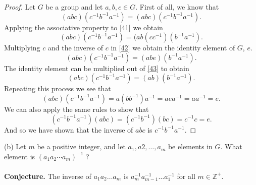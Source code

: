 \documentclass[11pt,a4paper]{article}
\begin{document}
\begin{proof}
Let $G$ be a group and let $a, b, c \in G$. First of all, we know that
\begin{equation}\label{41}
(abc)(c^{-1}b^{-1}a^{-1}) = (abc)(c^{-1}b^{-1}a^{-1}).
\end{equation}
Applying the associative property to \eqref{41} we obtain
\begin{equation}\label{42}
(abc)(c^{-1}b^{-1}a^{-1}) = (ab(cc^{-1})(b^{-1}a^{-1}).
\end{equation}
Multiplying $c$ and the inverse of $c$ in \eqref{42} we obtain the identity element of $G$, $e$.
\begin{equation}\label{43}
(abc)(c^{-1}b^{-1}a^{-1}) = (abe)(b^{-1}a^{-1}).
\end{equation}
The identity element can be multiplied out of \eqref{43} to obtain
\begin{equation}
(abc)(c^{-1}b^{-1}a^{-1}) = (ab)(b^{-1}a^{-1}).
\end{equation}
Repeating this process we see that
\[(abc)(c^{-1}b^{-1}a^{-1}) = a(bb^{-1})a^{-1} = aea^{-1} = aa^{-1} = e.\]
We can also apply the same rules to show that 
\[(c^{-1}b^{-1}a^{-1})(abc) = (c^{-1}b^{-1})(bc) = c^{-1}c = e.\]
And so we have shown that the inverse of $abc$ is $c^{-1}b^{-1}a^{-1}$.
\end{proof}

(b) Let $m$ be a positive integer, and let $a_1, a2 ,\ldots, a_m$ be elements in $G$.
What element is $(a_1 a_2 \cdots a_m )^{-1}$ ?\\
~\\
{\bf Conjecture. } The inverse of $a_1 a_2 \ldots a_m$ is $a_m^{-1}a_{m-1}^{-1}\ldots a_1^{-1}$ for all $m\in\mathbb{Z^+}$.
\end{document}
